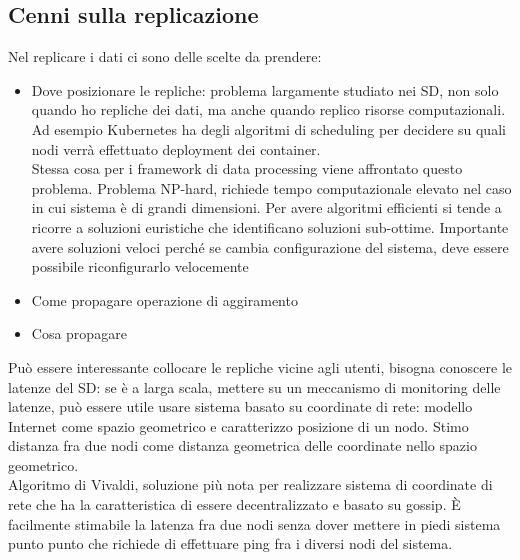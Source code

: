 \documentclass{article}
\begin{document}
\subsection{Cenni sulla replicazione}
Nel replicare i dati ci sono delle scelte da prendere:
\begin{itemize}
\item Dove posizionare le repliche: problema largamente studiato nei SD, non solo quando ho repliche dei dati, ma anche quando replico risorse computazionali.\\ Ad esempio Kubernetes ha degli algoritmi di scheduling per decidere su quali nodi verrà effettuato deployment dei container. \\ Stessa cosa per i framework di data processing viene affrontato questo problema. Problema NP-hard, richiede tempo computazionale elevato nel caso in cui sistema è di grandi dimensioni. Per avere algoritmi efficienti si tende a ricorre a soluzioni euristiche che identificano soluzioni sub-ottime. Importante avere soluzioni veloci perché se cambia configurazione del sistema, deve essere possibile riconfigurarlo velocemente
\item Come propagare operazione di aggiramento
\item Cosa propagare
\end{itemize} 
Può essere interessante collocare le repliche vicine agli utenti, bisogna conoscere le latenze del SD: se è a larga scala, mettere su un meccanismo di monitoring delle latenze, può essere utile usare sistema basato su coordinate di rete: modello Internet come spazio geometrico e caratterizzo posizione di un nodo. Stimo distanza fra due nodi come distanza geometrica delle coordinate nello spazio geometrico.\\ Algoritmo di Vivaldi, soluzione più nota per realizzare sistema di coordinate di rete che ha la caratteristica di essere decentralizzato e basato su gossip. È facilmente stimabile la latenza fra due nodi senza dover mettere in piedi sistema punto punto che richiede di effettuare ping fra i diversi nodi del sistema.
\end{document}
